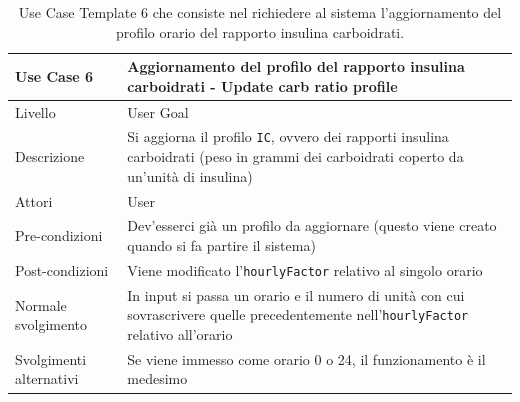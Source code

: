 \documentclass[twocolumn]{article}
\begin{document}
\begin{table}
    \centering
    \captionsetup{justification=centering}
    \begin{tabular}{|p{4.5cm}|p{9.5cm}|}
        \hline
        Use Case 6 & Aggiornamento del profilo del rapporto insulina carboidrati - Update carb ratio profile\\
        \hline
        Livello & User Goal \\
        \hline
        Descrizione & Si aggiorna il profilo \texttt{IC}, ovvero dei rapporti insulina carboidrati (peso in grammi dei carboidrati coperto da un'unità di insulina)\\
        \hline
        Attori & User \\
        \hline
        Pre-condizioni & Dev'esserci già un profilo da aggiornare (questo viene creato quando si fa partire il sistema)\\
        \hline
        Post-condizioni & Viene modificato l'\texttt{hourlyFactor} relativo al singolo orario\\
        \hline
        Normale svolgimento & In input si passa un orario e il numero di unità con cui sovrascrivere quelle precedentemente nell'\texttt{hourlyFactor} relativo all'orario\\
        \hline
        Svolgimenti alternativi & Se viene immesso come orario 0 o 24, il funzionamento è il medesimo\\
        \hline
    \end{tabular}
    \caption{Use Case Template 6 che consiste nel richiedere al sistema l'aggiornamento del profilo orario del rapporto insulina carboidrati.}
    \label{tab:uc6}
\end{table}
\end{document}
